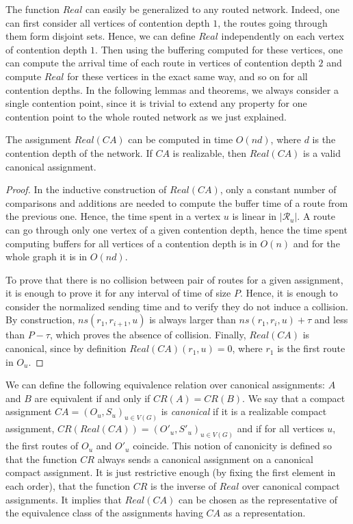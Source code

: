 The function $Real$ can easily be generalized to any routed network. Indeed, one can first consider all vertices of contention depth $1$, the routes going through them form disjoint sets. Hence, we can define $Real$ independently on each vertex of contention depth $1$. 
Then using the buffering computed for these vertices, one can compute the arrival time of each route in vertices of contention depth $2$ and compute $Real$ for these vertices in the exact same way, and so on for all contention depths. In the following lemmas and theorems, we always consider a single contention point, since it is trivial to extend any property for one contention point to the whole routed network as we just explained. 

\begin{lemma}\label{lemma:canonical}
The assignment $Real(CA)$ can be computed in time $O(nd)$, where $d$ is the contention
depth of the network. If $CA$ is realizable, then $Real(CA)$ is a valid canonical assignment.
\end{lemma}
\begin{proof}
In the inductive construction of $Real(CA)$, only a constant number of comparisons and additions are needed to compute the 
buffer time of a route from the previous one. Hence, the time spent in a vertex $u$ is linear in $|\mathcal{R}_u|$. 
A route can go through only one vertex of a given contention depth, hence the time spent computing buffers for all vertices
of a contention depth is in $O(n)$ and for the whole graph it is in $O(nd)$.

To prove that there is no collision between pair of routes for a given assignment, it is enough to 
prove it for any interval of time of size $P$. Hence, it is enough to consider the normalized sending time and to verify
they do not induce a collision. By construction,  $ns(r_1,r_{i+1},u)$ is always larger than $ns(r_1,r_{i},u) + \tau$ and less 
than $P - \tau$, which proves the absence of collision. Finally, $Real(CA)$ is canonical, since by definition $Real(CA)(r_1,u) = 0$, where $r_1$ is the first route in $O_u$.
\end{proof}

We can define the following equivalence relation over canonical assignments: $A$ and $B$ are equivalent if and only if $CR(A) = CR(B)$.
We say that a compact assignment $CA = (O_u,S_u)_{u \in V(G)}$ is \emph{canonical} if it is a realizable compact assignment, $CR(Real(CA)) = (O'_u,S'_u)_{u \in V(G)}$ and if for all vertices $u$, the first routes of $O_u$ and $O'_u$ coincide. This notion of canonicity is defined so that the function $CR$ always sends a canonical assignment on a canonical compact assignment. It is just restrictive enough (by fixing the first element in each order), that the function $CR$ is the inverse of $Real$ over canonical compact assignments. It implies that $Real(CA)$ can be chosen as the representative of the equivalence class of the assignments having $CA$ as a representation.


